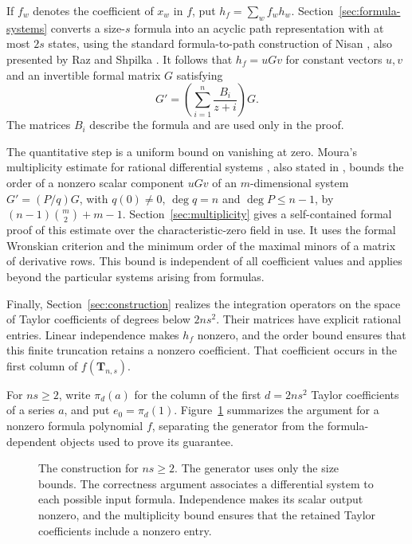 If $f_w$ denotes the coefficient of $x_w$ in $f$, put
$h_f=\sum_w f_wh_w$.
Section~\ref{sec:formula-systems} converts a size-$s$ formula into an acyclic
path representation with at most $2s$ states, using the standard formula-to-path
construction of Nisan \cite[Section~2, Lemma~1]{Nisan1991}, also presented
by Raz and Shpilka \cite[Section~2.1, Lemma~2, Step~1]{RazShpilka2005}.
It follows that $h_f=uGv$ for
constant vectors $u,v$ and an invertible formal matrix $G$ satisfying
\[
 G'=\left(\sum_{i=1}^n\frac{B_i}{z+i}\right)G.
\]
The matrices $B_i$ describe the formula and are used only in the proof.

The quantitative step is a uniform bound on vanishing at zero.
Moura's multiplicity estimate for rational differential systems
\cite{Moura2003}, also stated in \cite[Section~2, Theorem~1]{MouraHyperelliptic2003},
bounds the order of a nonzero scalar component $uGv$
of an $m$-dimensional system $G'=(P/q)G$, with $q(0)\ne0$,
$\deg q=n$ and $\deg P\le n-1$, by
$(n-1)\binom m2+m-1$. Section~\ref{sec:multiplicity} gives a self-contained
formal proof of this estimate over the characteristic-zero field in use.
It uses the formal Wronskian criterion
\cite{BostanDumas2010} and the minimum order of the maximal minors of
a matrix of derivative rows. This bound is independent of all coefficient
values and applies beyond the particular systems arising from formulas.

Finally, Section~\ref{sec:construction} realizes the integration operators
on the space of Taylor coefficients of degrees below $2ns^2$.
Their matrices have explicit rational entries. Linear independence makes
$h_f$ nonzero, and the order bound ensures that this finite truncation retains
a nonzero coefficient. That coefficient occurs in the first column of
$f(\mathbf T_{n,s})$.

For $ns\ge2$, write $\pi_d(a)$ for the column of the first $d=2ns^2$
Taylor coefficients of a series $a$, and put $e_0=\pi_d(1)$.
Figure~\ref{fig:proof-route} summarizes the argument for a nonzero
formula polynomial $f$, separating the generator from the
formula-dependent objects used to prove its guarantee.
\begin{figure}[ht]
\centering

\caption{The construction for $ns\ge2$. The generator uses only the size bounds.
The correctness argument
associates a differential system to each possible input formula. Independence
makes its scalar output nonzero, and the multiplicity bound ensures that
the retained Taylor coefficients include a nonzero entry.}
\label{fig:proof-route}
\end{figure}
